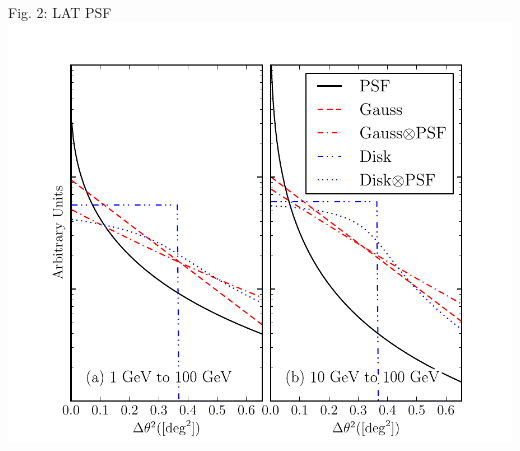\documentclass[12pt]{beamer}
\begin{document}
\begin{frame}{Fig. 2: LAT PSF}
    \includegraphics[scale=0.5]{plots/compare_disk_gauss_color.pdf}
\end{frame}
\end{document}
